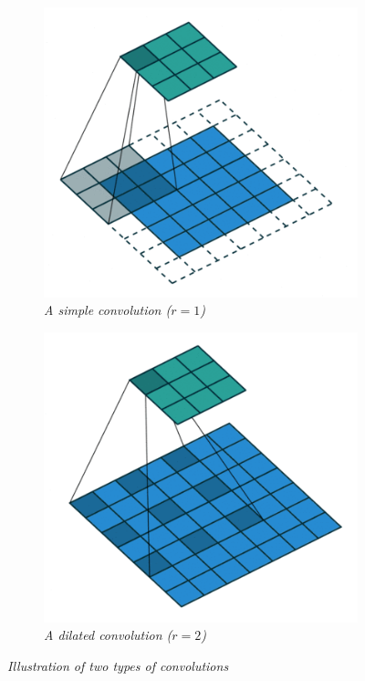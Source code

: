 \documentclass{article}
\begin{document}
            \begin{figure}
                \begin{subfigure}{.49\linewidth}
                    \centering
                    \includegraphics[width=.8\linewidth]{pics/conv-simple.png}
                    \caption{\textit{A simple convolution ($r=1$)}}
                    \label{fig:conv-simple}
                \end{subfigure}
                \begin{subfigure}{.49\linewidth}
                    \centering
                    \includegraphics[width=.8\linewidth]{pics/conv-dilated.png}
                    \caption{\textit{A dilated convolution ($r=2$)}}
                    \label{fig:conv-dilated}
                \end{subfigure}
                \caption{\textit{Illustration of two types of convolutions}}
            \end{figure}
\end{document}
